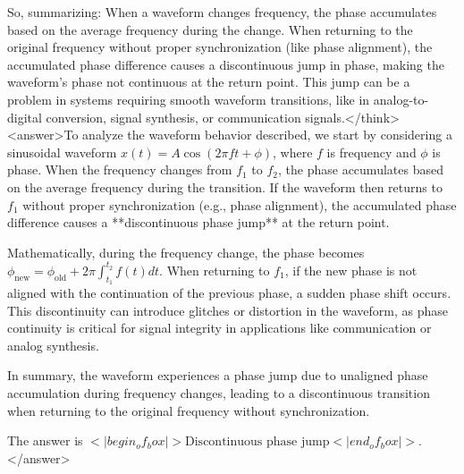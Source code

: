 So, summarizing: When a waveform changes frequency, the phase accumulates based on the average frequency during the change. When returning to the original frequency without proper synchronization (like phase alignment), the accumulated phase difference causes a discontinuous jump in phase, making the waveform's phase not continuous at the return point. This jump can be a problem in systems requiring smooth waveform transitions, like in analog-to-digital conversion, signal synthesis, or communication signals.</think><answer>To analyze the waveform behavior described, we start by considering a sinusoidal waveform \( x(t) = A \cos(2\pi f t + \phi) \), where \( f \) is frequency and \( \phi \) is phase. When the frequency changes from \( f_1 \) to \( f_2 \), the phase accumulates based on the average frequency during the transition. If the waveform then returns to \( f_1 \) without proper synchronization (e.g., phase alignment), the accumulated phase difference causes a **discontinuous phase jump** at the return point.  

Mathematically, during the frequency change, the phase becomes \( \phi_{\text{new}} = \phi_{\text{old}} + 2\pi \int_{t_1}^{t_2} f(t) dt \). When returning to \( f_1 \), if the new phase is not aligned with the continuation of the previous phase, a sudden phase shift occurs. This discontinuity can introduce glitches or distortion in the waveform, as phase continuity is critical for signal integrity in applications like communication or analog synthesis.  

In summary, the waveform experiences a phase jump due to unaligned phase accumulation during frequency changes, leading to a discontinuous transition when returning to the original frequency without synchronization.  

The answer is \(<|begin_of_box|>\text{Discontinuous phase jump}<|end_of_box|>\).</answer>